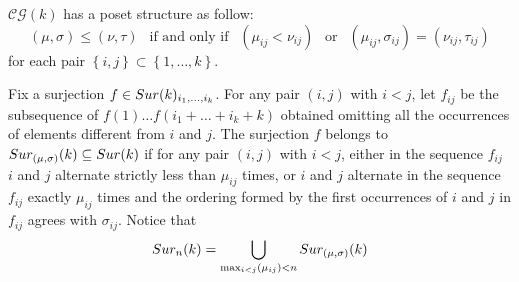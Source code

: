 \begin{definition}
	$\mathcal{CG}(k)$ has a poset structure as follow:
	\begin{equation*}
		(\mu,\sigma)\le (\nu,\tau) \ \ \text{ if and only if } \ \ (\mu_{ij}<\nu_{ij}) \ \ \text{ or } \ \ (\mu_{ij},\sigma_{ij})= (\nu_{ij},\tau_{ij})
	\end{equation*}
	for each pair $\left\lbrace i,j\right\rbrace \subset\left\lbrace 1,\dots,k  \right\rbrace $.
\end{definition}

\begin{definition}
	Fix a surjection $f\in Sur(k)_{i_{1},\dots,i_{k}}$.
	For any pair $(i,j)$ with $i< j$, let $f_{ij}$ be the subsequence of $f(1) \dots f(i_1+\dots+i_k+k)$ obtained omitting all the occurrences of elements different from $i$ and $j$.
	The surjection $f$ belongs to $Sur_{(\mu,\sigma)}(k)\subseteq Sur(k)$ if for any pair $(i,j)$ with $i< j$, either in the sequence $f_{ij}$ $i$ and $j$ alternate strictly less than $\mu_{ij}$ times,
	or $i$ and $j$ alternate in the sequence $f_{ij}$  exactly $\mu_{ij}$ times and the ordering formed by the first occurrences of $i$ and $j$ in $f_{ij}$ agrees with $\sigma_{ij}$.
	Notice that
	\begin{equation*}
		Sur_{n}(k)=\bigcup_{\max_{i<j}(\mu_{ij})< n} Sur_{(\mu,\sigma)}(k)
	\end{equation*}
\end{definition}

